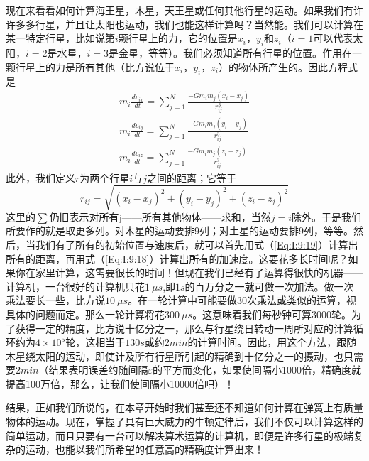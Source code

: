 现在来看看如何计算海王星，木星，天王星或任何其他行星的运动。如果我们有许许多多行星，并且让太阳也运动，我们也能这样计算吗？当然能。我们可以计算在某一特定行星，比如说第$i$颗行星上的力，它的位置是$x_i$，$y_i$和$z_i$（$i=1$可以代表太阳，$i=2$是水星，$i=3$是金星，等等）。我们必须知道所有行星的位置。作用在一颗行星上的力是所有其他（比方说位于$x_i$，$y_i$，$z_i$）的物体所产生的。因此方程式是
\begin{equation}
    \label{Eq:I:9:18}
    \begin{split}
        m_i \frac{dv_{ix}}{dt}=\sum_{j = 1}^{N} \frac{-Gm_im_j(x_i-x_j)}{r^3_{ij}}  \\
        m_i \frac{dv_{iy}}{dt}=\sum_{j = 1}^{N} \frac{-Gm_im_j(y_i-y_j)}{r^3_{ij}}  \\
        m_i \frac{dv_{iz}}{dt}=\sum_{j = 1}^{N} \frac{-Gm_im_j(z_i-z_j)}{r^3_{ij}}
    \end{split}
\end{equation}
此外，我们定义$r$为两个行星$i$与$j$之间的距离；它等于
\begin{equation}
    \label{Eq:I:9:19}
    r_{ij}=\sqrt{(x_i-x_j)^2 + (y_i-y_j)^2 + (z_i-z_j)^2}
\end{equation}
这里的$\sum$仍旧表示对所有j——所有其他物体——求和，当然$j=i$除外。于是我们所要作的就是取更多列。对木星的运动要排9列；对土星的运动要排9列，等等。然后，当我们有了所有的初始位置与速度后，就可以首先用式（\ref{Eq:I:9:19}）计算出所有的距离，再用式（\ref{Eq:I:9:18}）计算出所有的加速度。这要花多长时间呢？如果你在家里计算，这需要很长的时间！但现在我们已经有了运算得很快的机器——计算机，一台很好的计算机只花$1~\mu s$,即$1s$的百万分之一就可做一次加法。做一次乘法要长一些，比方说$10~\mu s$。在一轮计算中可能要做30次乘法或类似的运算，视具体的问题而定。那么一轮计算将花$300~\mu s$。这意味着我们每秒钟可算3000轮。为了获得一定的精度，比方说十亿分之一，那么与行星绕日转动一周所对应的计算循环约为$4 \times 10^5$轮，这相当于$130s$或约$2min$的计算时间。因此，用这个方法，跟随木星绕太阳的运动，即使计及所有行星所引起的精确到十亿分之一的摄动，也只需要$2min$（结果表明误差约随间隔$\varepsilon$的平方而变化，如果使间隔小1000倍，精确度就提高100万倍，那么，让我们使间隔小10000倍吧）！

结果，正如我们所说的，在本章开始时我们甚至还不知道如何计算在弹簧上有质量物体的运动。现在，掌握了具有巨大威力的牛顿定律后，我们不仅可以计算这样的简单运动，而且只要有一台可以解决算术运算的计算机，即便是许多行星的极端复杂的运动，也能以我们所希望的任意高的精确度计算出来！